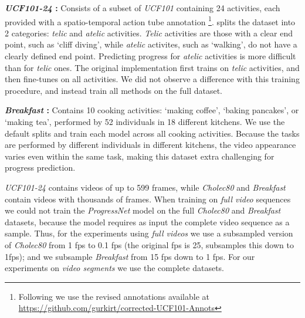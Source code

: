 
\smallskip\noindent\textbf{\textsl{UCF101-24} \cite{soomro2012}:} Consists of a subset of \textsl{UCF101} containing 24 activities, each provided with a spatio-temporal action tube annotation \footnote{Following \cite{becattini2017} we use the revised annotations available at \url{https://github.com/gurkirt/corrected-UCF101-Annots}}. 
\cite{becattini2017} splits the dataset into 2 categories: \textsl{telic} and \textsl{atelic} activities. 
\textsl{Telic} activities are those with a clear end point, such as `cliff diving', while \textsl{atelic} activites, such as `walking', do not have a clearly defined end point. 
Predicting progress for \textsl{atelic} activities is more difficult than for \textsl{telic} ones.
The original implementation first trains on \textsl{telic} activities, and then fine-tunes on all activities. 
We did not observe a difference with this training procedure, and instead train all methods on the full dataset.

\smallskip\noindent\textbf{\textsl{Breakfast} \cite{kuehne2014, kuehne2016}:} Contains 10 cooking activities: \eg `making coffee', `baking pancakes', or `making tea', performed by 52 individuals in 18 different kitchens. 
We use the default splits and train each model across all cooking activities. 
Because the tasks are performed by different individuals in different kitchens, the video appearance varies even within the same task, making this dataset extra challenging for progress prediction.


\textsl{UCF101-24} contains videos of up to 599 frames, while \textsl{Cholec80} and \textsl{Breakfast} contain videos with thousands of frames.
When training on \textsl{full video} sequences we could not train the \textsl{ProgressNet} model on the full \textsl{Cholec80} and \textsl{Breakfast} datasets, because the model requires as input the complete video sequence as a sample.
Thus, for the experiments using \textsl{full videos} we use a subsampled version of \textsl{Cholec80} from 1 fps to 0.1 fps (the original fps is 25, \cite{twinanda2019} subsamples this down to 1fps); and we subsample \textsl{Breakfast} from 15 fps down to 1 fps. 
For our experiments on \textsl{video segments} we use the complete datasets.

